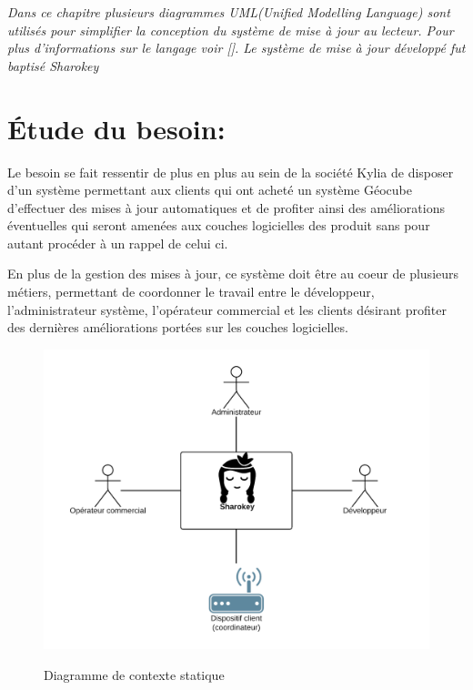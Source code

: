 \documentclass{themeensg}
\begin{document}
\textit{ Dans ce chapitre plusieurs diagrammes UML(Unified Modelling Language) sont utilisés pour simplifier la conception du système de mise à jour au lecteur. Pour plus d'informations sur le langage voir []. Le système de mise à jour développé fut baptisé Sharokey}
\section{Étude du besoin:}
Le besoin se fait ressentir de plus en plus au sein de la société Kylia de disposer d'un système permettant aux clients qui ont acheté un système Géocube  d'effectuer des mises à jour automatiques et de profiter ainsi des améliorations éventuelles qui seront amenées aux couches logicielles des produit sans pour autant procéder à un rappel de celui ci.

En plus de la gestion des mises à jour, ce système doit être au coeur de plusieurs métiers, permettant de coordonner le travail entre le développeur, l'administrateur système, l'opérateur commercial et les clients désirant profiter des dernières améliorations portées sur les couches logicielles.

\begin{figure}[h!]
\includegraphics[scale=0.9]{images/context_general.png}
\label{fig:context_statique}
\centering
\caption{Diagramme de contexte statique}
\end{figure}
\end{document}

